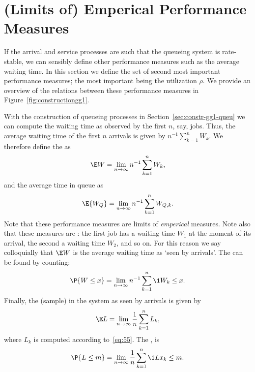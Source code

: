 \section{(Limits of) Emperical Performance Measures}
\label{sec:limits-of-emperical}

If the arrival and service processes are such that the queueing system
is rate-stable, we can sensibly define other performance measures such
as the average waiting time. In this section we define the set of
second most important performance measures; the most important being
the utilization $\rho$. We provide an overview of the relations
between these performance measures in
Figure~\ref{fig:constructiongg1}.


With the construction of queueing processes in
Section~\ref{sec:constr-gg1-queu} we can compute the waiting time as
observed by the first $n$, say, jobs. Thus, the average waiting time
of the first $n$ arrivals is given by $n^{-1}\sum_{k=1}^n W_k$. We
therefore define the  as
\begin{equation}\label{eq:49}
  \E W = \lim_{n\to\infty} n^{-1}\sum_{k=1}^n W_k,
\end{equation}
and the average time in queue as
\begin{equation}\label{eq:50}
  \E{W_Q} = \lim_{n\to\infty} n^{-1}\sum_{k=1}^n W_{Q,k}.
\end{equation}
Note that these performance measures are limits of \emph{emperical}
measures.  Note also that these measures are : the first job has a waiting time $W_1$
at the moment of its arrival, the second a waiting time $W_2$, and so
on. For this reason we say colloquially that $\E W$ is the average
waiting time as `seen by arrivals'.  The  can  be found by counting:
\begin{equation}\label{eq:48}
  \P{W \leq x}  = \lim_{n\to\infty} n^{-1}\sum_{k=1}^n \1{W_k\leq x}.
\end{equation}
Finally, the (sample)  in the system as seen by
arrivals is given by
\begin{equation}\label{eq:EQ}
\E L =  \lim_{n\to\infty}\frac 1 n \sum_{k=1}^n L_k,
\end{equation}
where $L_k$ is computed according to~\eqref{eq:55}.  The
,
is
\begin{equation}\label{eq:Qm}
\P{L\leq m} = \lim_{n\to\infty} \frac 1 n \sum_{k=1}^n \1{Lx_k \leq m}.
\end{equation}



